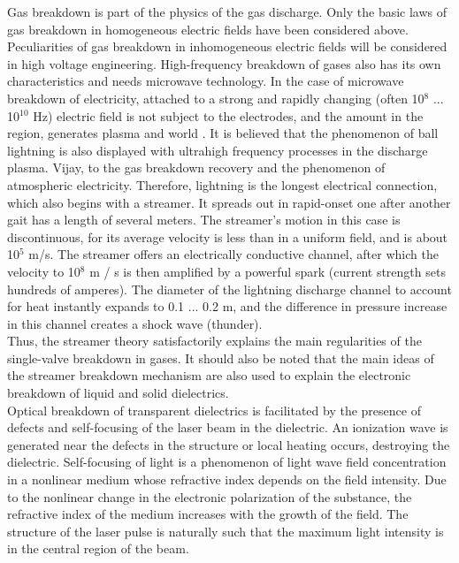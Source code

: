 \documentclass[a4paper,14pt]{extreport}
\begin{document}
Gas breakdown is part of the physics of the gas discharge. Only the basic laws of gas breakdown in homogeneous electric fields have been considered above. Peculiarities of gas breakdown in inhomogeneous electric fields will be considered in high voltage engineering. High-frequency breakdown of gases also has its own characteristics and needs microwave technology. In the case of microwave breakdown of electricity, attached to a strong and rapidly changing (often 10$^{8}$ ... 10$^{10}$ Hz) electric field is not subject to the electrodes, and the amount in the region, generates plasma and world .
It is believed that the phenomenon of ball lightning is also displayed with ultrahigh frequency processes in the discharge plasma. Vijay, to the gas breakdown recovery and the phenomenon of atmospheric electricity. Therefore, lightning is the longest electrical connection, which also begins with a streamer. It spreads out in rapid-onset one after another gait has a length of several meters. The streamer's motion in this case is discontinuous, for its average velocity is less than in a uniform field, and is about 10$^{5}$ m/s. The streamer offers an electrically conductive channel, after which the velocity to 10$^{8}$ m / s is then amplified by a powerful spark (current strength sets hundreds of amperes). The diameter of the lightning discharge channel to account for heat instantly expands to 0.1 ... 0.2 m, and the difference in pressure increase in this channel creates a shock wave (thunder). \\

Thus, the streamer theory satisfactorily explains the main regularities of the single-valve breakdown in gases. It should also be noted that the main ideas of the streamer breakdown mechanism are also used to explain the electronic breakdown of liquid and solid dielectrics. \\

Optical breakdown of transparent dielectrics is facilitated by the presence of defects and self-focusing of the laser beam in the dielectric. An ionization wave is generated near the defects in the structure or local heating occurs, destroying the dielectric. Self-focusing of light is a phenomenon of light wave field concentration in a nonlinear medium whose refractive index depends on the field intensity. Due to the nonlinear change in the electronic polarization of the substance, the refractive index of the medium increases with the growth of the field. The structure of the laser pulse is naturally such that the maximum light intensity is in the central region of the beam. \\
\end{document}
